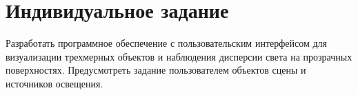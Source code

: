 \section*{Индивидуальное задание}

  Разработать программное обеспечение с пользовательским интерфейсом для визуализации трехмерных объектов и наблюдения дисперсии света на прозрачных поверхностях. Предусмотреть задание пользователем объектов сцены и источников освещения.
